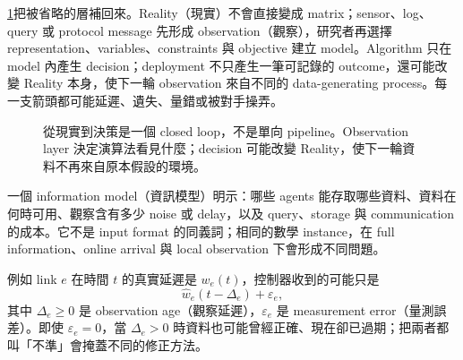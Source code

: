 \documentclass[11pt,a4paper,oneside,openany]{book}
\begin{document}
\cref{fig:observation-pipeline}把被省略的層補回來。Reality（現實）不會直接變成 matrix；sensor、log、query 或 protocol message 先形成 observation（觀察），研究者再選擇 representation、variables、constraints 與 objective 建立 model。Algorithm 只在 model 內產生 decision；deployment 不只產生一筆可記錄的 outcome，還可能改變 Reality 本身，使下一輪 observation 來自不同的 data-generating process。每一支箭頭都可能延遲、遺失、量錯或被對手操弄。

\begin{figure}[htbp]
\centering
{}
\caption{從現實到決策是一個 closed loop，不是單向 pipeline。Observation layer 決定演算法看見什麼；decision 可能改變 Reality，使下一輪資料不再來自原本假設的環境。}
\label{fig:observation-pipeline}
\end{figure}

\begin{definition}
一個 information model（資訊模型）明示：哪些 agents 能存取哪些資料、資料在何時可用、觀察含有多少 noise 或 delay，以及 query、storage 與 communication 的成本。它不是 input format 的同義詞；相同的數學 instance，在 full information、online arrival 與 local observation 下會形成不同問題。
\end{definition}

例如 link $e$ 在時間 $t$ 的真實延遲是 $w_e(t)$，控制器收到的可能只是
\[
 \widehat w_e(t-\Delta_e)+\varepsilon_e,
\]
其中 $\Delta_e\ge0$ 是 observation age（觀察延遲），$\varepsilon_e$ 是 measurement error（量測誤差）。即使 $\varepsilon_e=0$，當 $\Delta_e>0$ 時資料也可能曾經正確、現在卻已過期；把兩者都叫「不準」會掩蓋不同的修正方法。
\end{document}
